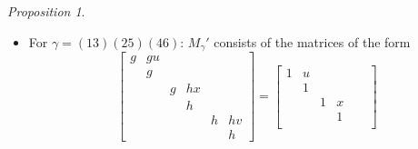 \documentclass[12pt]{amsart}
\theoremstyle{Theorem}
\theoremstyle{Theorem}
\theoremstyle{Theorem}
\theoremstyle{Theorem}
\theoremstyle{Plain}
\theoremstyle{remark}
\theoremstyle{remark}
\theoremstyle{Definition}
\newtheorem{prpd}[dfn]{Proposition}
\begin{document}
\begin{prpd}
\begin{itemize}
\[\begin{bmatrix}
                  &    &   & g  &   &   \\
                  &    &   &    & h & hv\\
                  &    &   &    &   & h
            \end{bmatrix}
            =
            \begin{bmatrix}
                1 & x &   &   &   &  \\
                  & 1 &   &   &   &  \\
                  &   & 1 & u &   &  \\
                  &   &   & 1 &   &  \\
                  &   &   &   & 1 & v\\
                  &   &   &   &   & 1
            \end{bmatrix}
            \begin{bmatrix}
                g &   &   &   &   &  \\
                  & h &   &   &   &  \\
                  &   & g &   &   &  \\
                  &   &   & g &   &  \\
                  &   &   &   & h &  \\
                  &   &   &   &   & h
            \end{bmatrix}
        \]
        for $ g, h \in k^\times $ and $ u, v, x \in k $.
        \item[(c)] For $ \gamma = (13)(25)(46) $: $M_\gamma'$ consists of the matrices of the form
        \[
            \begin{bmatrix}
                g & gu &   &    &   &   \\
                  & g  &   &    &   &   \\
                  &    & g & hx &   &   \\
                  &    &   & h  &   &   \\
                  &    &   &    & h & hv\\
                  &    &   &    &   & h
            \end{bmatrix}
            =
            \begin{bmatrix}
                1 & u &   &   &   &  \\
                  & 1 &   &   &   &  \\
                  &   & 1 & x &   &  \\
                  &   &   & 1 &   &  \\

\end{bmatrix}\]
\end{itemize}
\end{prpd}
\end{document}
